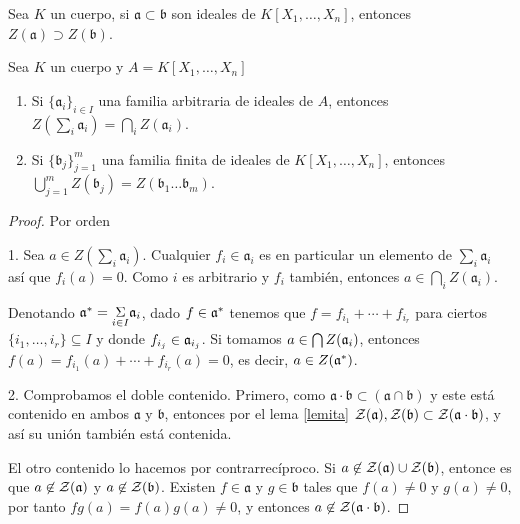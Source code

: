 \documentclass[./main.tex]{subfiles}
\begin{document}
	\begin{lemma} \label{lemita}
		Sea $K$ un cuerpo, si $\mathfrak{a}\subset \mathfrak b$ son ideales de $K[X_1,\ldots, X_n]$, entonces $Z(\mathfrak{a}) \supset Z (\mathfrak b)$.
	\end{lemma}
	
	\begin{proposition}
		Sea $K$ un cuerpo y $A = K[X_1,\dots , X_n]$
		\begin{enumerate}
			\item Si $\{\mathfrak a_i\}_{i\in I}$ una familia arbitraria de ideales de $A$, entonces $Z(\sum_i \mathfrak a_i) = \bigcap_i Z(\mathfrak a_i)$.
			\item Si $\{\mathfrak b_j\}_{j = 1}^m$ una familia finita de ideales de $K[X_1,\dots , X_n]$, entonces $\bigcup_{j=1}^m Z(\mathfrak b_j) = Z(\mathfrak b_1 \dots \mathfrak b_m)$.
		\end{enumerate}
	\end{proposition}
	\begin{proof}
		Por orden
		
		1. Sea $a\in Z(\sum_i \mathfrak a_i)$. Cualquier $f_i \in \mathfrak a_i$ es en particular un elemento de $\sum_i \mathfrak a_i$ así que $f_i(a)  = 0$. Como $i$ es arbitrario y $f_i$ también, entonces $a \in \bigcap_i Z(\mathfrak a_i)$.
		
		Denotando $\mathfrak{a}^*=\underset{i\in I}{\Sigma}\mathfrak{a}_i$, dado $f\in\mathfrak{a}^*$ tenemos que $f=f_{i_1}+\cdots+f_{i_r}$ para ciertos $\{i_1,\dots,i_r\}\subseteq I$ y donde $f_{i_j}\in\mathfrak{a}_{i_j}$. Si tomamos $a\in\bigcap Z(\mathfrak{a}_i)$, entonces $f(a)=f_{i_1}(a)+\cdots+f_{i_r}(a)=0$, es decir, $a\in Z(\mathfrak{a}^*)$.
		
		
		
		2. Comprobamos el doble contenido. Primero, como $\mathfrak a \cdot \mathfrak b \subset ( \mathfrak a \cap \mathfrak b )$ y este está contenido en ambos $\mathfrak a$ y $\mathfrak b$, entonces por el lema \ref{lemita} $\mathcal{Z}(\mathfrak a), \mathcal{Z}(\mathfrak b)\subset \mathcal{Z}(\mathfrak a \cdot \mathfrak b) $, y así su unión también está contenida.
		
		El otro contenido lo hacemos por contrarrecíproco.  Si $a\not\in \mathcal{Z}(\mathfrak a)\cup \mathcal{Z}(\mathfrak b)$, entonce es que $a\not\in \mathcal{Z}( \mathfrak a)$ y $a\not\in \mathcal{Z}( \mathfrak b)$. Existen $f\in \mathfrak a$ y $g\in \mathfrak b$ tales que $f(a)\neq 0$ y $g(a) \neq 0$, por tanto $fg(a) = f(a)g(a) \neq 0$, y entonces $a\not\in \mathcal{Z}(\mathfrak a\cdot \mathfrak b)$.
		
	\end{proof}
	
\end{document}
